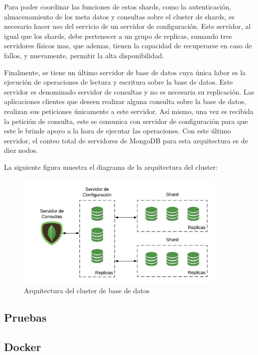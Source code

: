 Para poder coordinar las funciones de estos shards, como la autenticación, almacenamiento de los meta datos y consultas sobre el cluster de shards,
es necesario hacer uso del servicio de un servidor de configuración.
Este servidor, al igual que los shards, debe pertenecer a un grupo de replicas, sumando tres servidores físicos mas, que ademas,
tienen la capacidad de recuperarse en caso de fallos, y nuevamente, permitir la alta disponibilidad.

Finalmente, se tiene un último servidor de base de datos cuya única labor es la ejecución de operaciones de lectura y escritura sobre la base de datos.
Este servidor es denominado servidor de consultas y no es necesaria su replicación.
Las aplicaciones clientes que deseen realizar alguna consulta sobre la base de datos, realizan sus peticiones únicamente a este servidor.
Así mismo, una vez es recibida la petición de consulta, este se comunica con servidor de configuración para que este le brinde apoyo a la hora de ejecutar las operaciones.
Con este último servidor, el conteo total de servidores de MongoDB para esta arquitectura es de diez nodos.

La siguiente figura muestra el diagrama de la arquitectura del cluster:

\begin{figure}[H]
	\centering
		\includegraphics[width=0.9\textwidth]{figures/mongo_cluster}
	\caption{Arquitectura del cluster de base de datos}
	\label{fig:mongo_cluster}
\end{figure}

\subsection{Pruebas}


\subsection{Docker}


